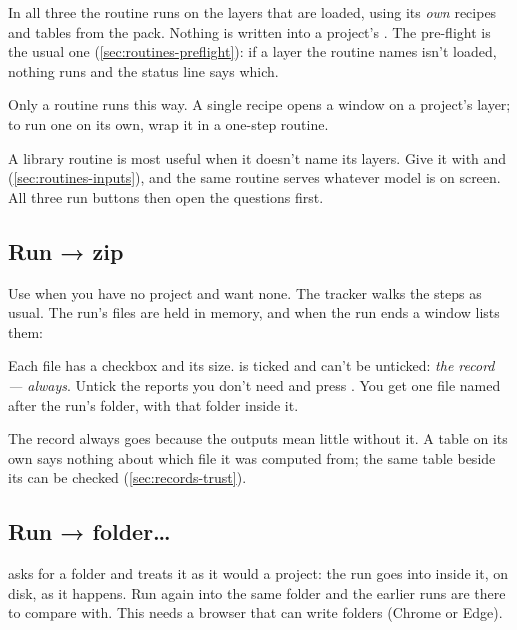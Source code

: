 In all three the routine runs on the layers that are loaded, using its \emph{own} recipes and tables from the pack. Nothing is written into a project's . The pre-flight is the usual one (\cref{sec:routines-preflight}): if a layer the routine names isn't loaded, nothing runs and the status line says which.

Only a routine runs this way. A single recipe opens a window on a project's layer; to run one on its own, wrap it in a one-step routine.

\begin{tip}
A library routine is most useful when it doesn't name its layers. Give it  with  and  (\cref{sec:routines-inputs}), and the same routine serves whatever model is on screen. All three run buttons then open the questions first.
\end{tip}

\subsection{Run → zip}\label{sec:library-zip}
Use  when you have no project and want none. The tracker walks the steps as usual. The run's files are held in memory, and when the run ends a window lists them:


Each file has a checkbox and its size.  is ticked and can't be unticked: \emph{the record — always}. Untick the reports you don't need and press . You get one file named after the run's folder, with that folder inside it.

\begin{why}
The record always goes because the outputs mean little without it. A table on its own says nothing about which file it was computed from; the same table beside its  can be checked (\cref{sec:records-trust}).
\end{why}

\subsection{Run → folder…}
 asks for a folder and treats it as it would a project: the run goes into  inside it, on disk, as it happens. Run again into the same folder and the earlier runs are there to compare with. This needs a browser that can write folders (Chrome or Edge).

